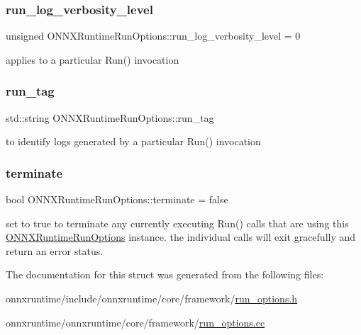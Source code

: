 \mbox{\label{structONNXRuntimeRunOptions_a386538b6ddbc2bf4496765ad846f53ee}} 
\subsubsection{\texorpdfstring{run\+\_\+log\+\_\+verbosity\+\_\+level}{run\_log\_verbosity\_level}}
{\footnotesize\ttfamily unsigned O\+N\+N\+X\+Runtime\+Run\+Options\+::run\+\_\+log\+\_\+verbosity\+\_\+level = 0}



applies to a particular Run() invocation 

\mbox{\label{structONNXRuntimeRunOptions_a99098c7d810216a1b1dab088cdf548e5}} 
\subsubsection{\texorpdfstring{run\+\_\+tag}{run\_tag}}
{\footnotesize\ttfamily std\+::string O\+N\+N\+X\+Runtime\+Run\+Options\+::run\+\_\+tag}



to identify logs generated by a particular Run() invocation 

\mbox{\label{structONNXRuntimeRunOptions_a62e0e505a23e7e87976953ddeb056fb3}} 
\subsubsection{\texorpdfstring{terminate}{terminate}}
{\footnotesize\ttfamily bool O\+N\+N\+X\+Runtime\+Run\+Options\+::terminate = false}

set to \textquotesingle{}true\textquotesingle{} to terminate any currently executing Run() calls that are using this \mbox{\hyperlink{structONNXRuntimeRunOptions}{O\+N\+N\+X\+Runtime\+Run\+Options}} instance. the individual calls will exit gracefully and return an error status. 

The documentation for this struct was generated from the following files\+:\begin{DoxyCompactItemize}
\item 
onnxruntime/include/onnxruntime/core/framework/\mbox{\hyperlink{run__options_8h}{run\+\_\+options.\+h}}\item 
onnxruntime/onnxruntime/core/framework/\mbox{\hyperlink{run__options_8cc}{run\+\_\+options.\+cc}}\end{DoxyCompactItemize}
